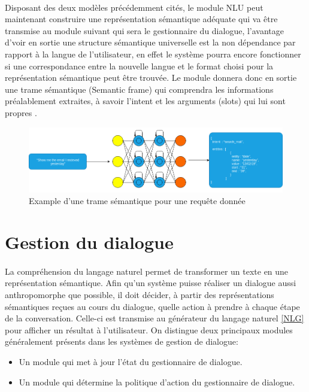 		\paragraph{}
		Disposant des deux modèles précédemment cités, le module NLU peut maintenant construire une représentation sémantique adéquate qui va être transmise au module suivant qui sera le gestionnaire du dialogue, l'avantage d'voir en sortie une structure sémantique universelle est la non dépendance par rapport à la langue de l'utilisateur, en effet le système pourra encore fonctionner si une correspondance entre la nouvelle langue et le format choisi pour la représentation sémantique peut être trouvée. Le module donnera donc en sortie une trame sémantique (Semantic frame) qui comprendra les informations préalablement extraites, à savoir l'intent et les arguments (slots) qui lui sont propres \cite{intent_classification,intent_slots,semantic_frame}.
		\begin{figure}[H]
			\centering
			\label{semantic_frame}
			\includegraphics[width=0.80\linewidth]{images/NLU/semantic_frames.png}
			\caption{Example d'une trame sémantique pour une requête donnée}
		\end{figure} 
\section{Gestion du dialogue}
	\paragraph{}
	La compréhension du langage naturel permet de transformer un texte en une représentation sémantique. Afin qu’un système puisse réaliser un dialogue aussi anthropomorphe que possible, il doit décider, à partir des représentations sémantiques reçues au cours du dialogue, quelle action à prendre à chaque étape de la conversation. Celle-ci est transmise au générateur du langage naturel \ref{NLG} pour afficher un résultat à l’utilisateur. On distingue deux principaux modules généralement présents dans les systèmes de gestion de dialogue:
\begin{itemize}
	\item Un module qui met à jour l’état du gestionnaire de dialogue.
	\item Un module qui détermine la politique d’action du gestionnaire de dialogue.
\end{itemize}

